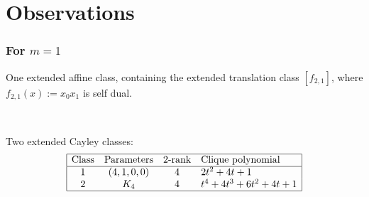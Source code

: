 \documentclass[pdf,sprung,slideColor,nocolorBG]{beamer}
\begin{document}
\section{Observations}
\begin{frame}
\frametitle{For $m=1$}

One extended affine class, containing the extended translation class $[f_{2,1}]$,
where $f_{2,1}(x) := x_0 x_1$ is self dual.

~

Two extended Cayley classes:
\begin{align*}
\begin{array}{|cccl|}
\hline
\text{Class} &
\text{Parameters} & 
\text{2-rank} &
\text{Clique polynomial}
\\
\hline
1 &
(4, 1, 0, 0) & 4 & 
2t^{2} + 4t + 1
\\
2 &
K_4 & 4 & 
t^{4} + 4t^{3} + 6t^{2} + 4t + 1
\\
\hline
\end{array}
\end{align*}

\end{frame}
\end{document}
